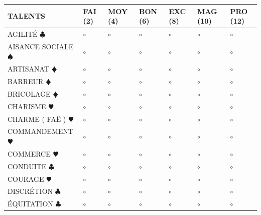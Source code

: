\documentclass[a5paper,french]{article}
\begin{document}
\begin{tabular}[c]{|p{}|p{}|p{}|p{}|p{}|p{}|p{}|}
	\hline
	\textbf{TALENTS}									&	FAI (2)	&	MOY (4)	&	BON (6)	&	EXC (8)	&	MAG (10)	&	PRO (12)	\\ \hline
	AGILITÉ { $\clubsuit$ }								&	$\circ$	&	$\circ$	&	$\circ$	&	$\circ$	&	$\circ$		&	$\circ$		\\ \hline
	AISANCE SOCIALE { $\spadesuit$ }					&	$\circ$	&	$\circ$	&	$\circ$	&	$\circ$	&	$\circ$		&	$\circ$		\\ \hline
	ARTISANAT {\color{red} $\vardiamond$ }				&	$\circ$	&	$\circ$	&	$\circ$	&	$\circ$	&	$\circ$		&	$\circ$		\\ \hline	
	BARREUR {\color{red} $\vardiamond$ }				&	$\circ$	&	$\circ$	&	$\circ$	&	$\circ$	&	$\circ$		&	$\circ$		\\ \hline
	BRICOLAGE {\color{red} $\vardiamond$ }				&	$\circ$	&	$\circ$	&	$\circ$	&	$\circ$	&	$\circ$		&	$\circ$		\\ \hline
	CHARISME {\color{red} $\varheart$ }					&	$\circ$	&	$\circ$	&	$\circ$	&	$\circ$	&	$\circ$		&	$\circ$		\\ \hline
	CHARME ( FAË ) {\color{red} $\varheart$ }			&	$\circ$	&	$\circ$	&	$\circ$	&	$\circ$	&	$\circ$		&	$\circ$		\\ \hline
	COMMANDEMENT {\color{red} $\varheart$ }				&	$\circ$	&	$\circ$	&	$\circ$	&	$\circ$	&	$\circ$		&	$\circ$		\\ \hline
	COMMERCE {\color{red} $\varheart$ }					&	$\circ$	&	$\circ$	&	$\circ$	&	$\circ$	&	$\circ$		&	$\circ$		\\ \hline
	CONDUITE { $\clubsuit$ }							&	$\circ$	&	$\circ$	&	$\circ$	&	$\circ$	&	$\circ$		&	$\circ$		\\ \hline
	COURAGE {\color{red} $\varheart$ }					&	$\circ$	&	$\circ$	&	$\circ$	&	$\circ$	&	$\circ$		&	$\circ$		\\ \hline
	DISCRÉTION { $\clubsuit$ }							&	$\circ$	&	$\circ$	&	$\circ$	&	$\circ$	&	$\circ$		&	$\circ$		\\ \hline
	ÉQUITATION { $\clubsuit$ }							&	$\circ$	&	$\circ$	&	$\circ$	&	$\circ$	&	$\circ$		&	$\circ$		\\ \hline

\end{tabular}
\end{document}
